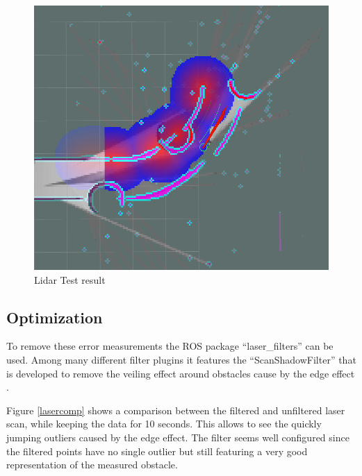 \begin{figure} 
	\includegraphics[width=\textwidth]{Pictures/Needs filtering of Laser}
	\caption{Lidar Test result}
	\label{unfiltered lidar}
\end{figure}

\subsection{Optimization}
To remove these error measurements the ROS package ``laser\_filters'' can be used. Among many different filter plugins it features the ``ScanShadowFilter'' that is developed to remove the veiling effect around obstacles cause by the edge effect \cite{laserfilters}.


Figure \ref{lasercomp} shows a comparison between the filtered and unfiltered laser scan, while keeping the data for 10 seconds. This allows to see the quickly jumping outliers caused by the edge effect. The filter seems well configured since the filtered points have no single outlier but still featuring a very good representation of the measured obstacle.

